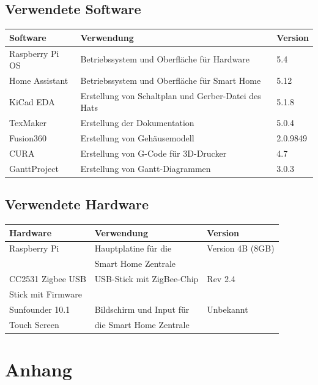 \documentclass[12pt,a4paper]{article}
\begin{document}
 	\subsection{Verwendete Software}
 	\begin{tabular}{|l|l|l|}
 	\hline 
 	\textbf{Software} & \textbf{Verwendung} & \textbf{Version} \\ 
 	\hline 
 	Raspberry Pi OS & Betriebssystem und Oberfläche für Hardware & 5.4 \\ 
 	\hline 
 	Home Assistant & Betriebssystem und Oberfläche für Smart Home & 5.12 \\ 
 	\hline 
 	KiCad EDA & Erstellung von Schaltplan und Gerber-Datei des Hats & 5.1.8 \\ 
 	\hline 
 	TexMaker & Erstellung der Dokumentation & 5.0.4 \\ 
 	\hline 
 	Fusion360 & Erstellung von Gehäusemodell & 2.0.9849 \\ 
 	\hline
 	CURA & Erstellung von G-Code für 3D-Drucker & 4.7 \\ 
 	\hline
 	GanttProject & Erstellung von Gantt-Diagrammen & 3.0.3 \\ 
 	\hline
 	\end{tabular} 
 	\subsection{Verwendete Hardware}
 	\begin{tabular}{|l|l|l|}
 	\hline
 	\textbf{Hardware} & \textbf{Verwendung} & \textbf{Version} \\
 	\hline
 	Raspberry Pi & Hauptplatine für die  & Version 4B (8GB)\\
 	 & Smart Home Zentrale &\\
 	\hline
 	CC2531 Zigbee USB & USB-Stick mit ZigBee-Chip & Rev 2.4\\
 	Stick mit Firmware& & \\
 	\hline
 	Sunfounder 10.1  & Bildschirm und Input für & Unbekannt\\
 	Touch Screen & die Smart Home Zentrale & \\
 	 \hline
 	\end{tabular}
 	\section{Anhang}
\end{document}
